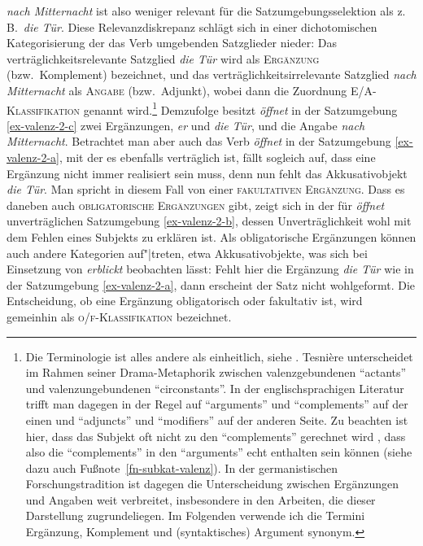 {\it nach Mitternacht} ist also weniger relevant für die Satzumgebungsselektion als z.\,B.\ {\it die Tür}. Diese Relevanzdiskrepanz schlägt sich in einer dichotomischen Kategorisierung der das Verb umgebenden Satzglieder nieder: Das verträglichkeitsrelevante Satzglied {\it die Tür} wird als \textsc{Ergänzung} (bzw.\ Komplement) bezeichnet, und das verträglichkeitsirrelevante Satzglied {\it nach Mitternacht} als \textsc{Angabe} (bzw.\ Adjunkt), wobei dann die Zuordnung \textsc{E/A-Klassifikation} genannt wird.\footnote{Die Terminologie ist alles andere als einheitlich, siehe \citet[766]{Storrer:03}. Tesni\`ere unterscheidet im Rahmen seiner Drama-Metaphorik zwischen valenzgebundenen "`actants"' und valenzungebundenen "`circonstants"'. In der englischsprachigen Literatur trifft man dagegen in der Regel auf "`arguments"' und "`complements"' auf der einen und "`adjuncts"' und "`modifiers"' auf der anderen Seite. Zu beachten ist hier, dass das Subjekt oft nicht zu den "`complements"' gerechnet wird \citep[25]{Mueller:10}, dass also die "`complements"' in den "`arguments"' echt enthalten sein können (siehe dazu auch Fu\ss note~\ref{fn-subkat-valenz}). In der germanistischen Forschungstradition ist dagegen die Unterscheidung zwischen Ergänzungen und Angaben weit verbreitet, insbesondere in den Arbeiten, die dieser Darstellung zugrundeliegen. Im Folgenden verwende ich die Termini Ergänzung, Komplement und (syntaktisches) Argument synonym.} Demzufolge besitzt {\it öffnet} in der Satzumgebung \ref{ex-valenz-2-c} zwei Ergänzungen, {\it er} und {\it die Tür}, und die Angabe {\it nach Mitternacht}. Betrachtet man aber auch das Verb {\it öffnet} in der Satzumgebung \ref{ex-valenz-2-a}, mit der es ebenfalls verträglich ist, fällt sogleich auf, dass eine Ergänzung nicht immer realisiert sein muss, denn nun fehlt das Akkusativobjekt {\it die Tür}. Man spricht in diesem Fall von einer \textsc{fakultativen Ergänzung}. Dass es daneben auch \textsc{obligatorische Ergänzungen} gibt, zeigt sich in der für {\it öffnet} unverträglichen Satzumgebung \ref{ex-valenz-2-b}, dessen Unverträglichkeit wohl mit dem Fehlen eines Subjekts zu erklären ist. Als obligatorische Ergänzungen können auch andere Kategorien auf"|treten, etwa Akkusativobjekte, was sich bei Einsetzung von {\it erblickt} beobachten lässt: Fehlt hier die Ergänzung {\it die Tür} wie in der Satzumgebung \ref{ex-valenz-2-a}, dann erscheint der Satz nicht wohlgeformt. Die Entscheidung, ob eine Ergänzung obligatorisch oder fakultativ ist, wird gemeinhin als \textsc{o/f-Klassifikation} bezeichnet. 

